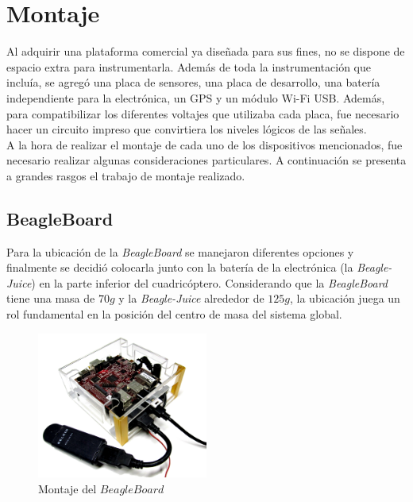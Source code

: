 \documentclass[main]{subfiles}
\begin{document}
\chapter{Montaje}
\label{chap:montaje}

Al adquirir una plataforma comercial ya diseñada para sus fines, no se dispone de espacio extra para instrumentarla. Además de toda la instrumentación que incluía, se agregó una placa de sensores, una placa de desarrollo, una batería independiente para la electrónica, un GPS y un módulo Wi-Fi USB. Además, para compatibilizar los diferentes voltajes que utilizaba cada placa, fue necesario hacer un circuito impreso que convirtiera los niveles lógicos de las señales.\\

A la hora de realizar el montaje de cada uno de los dispositivos mencionados, fue necesario realizar algunas consideraciones particulares. A continuación se presenta a grandes rasgos el trabajo de montaje realizado.

\section*{BeagleBoard}

Para la ubicación de la \emph{BeagleBoard} se manejaron diferentes opciones y finalmente se decidió colocarla junto con la batería de la electrónica (la \emph{Beagle-Juice}) en la parte inferior del cuadricóptero. Considerando que la \emph{BeagleBoard} tiene una masa de $70g$ y la \emph{Beagle-Juice} alrededor de $125g$, la ubicación juega un rol fundamental en la posición del centro de masa del sistema global.\\

\begin{figure}
	\centering
	\vspace{-20pt}
		\includegraphics[width=0.5\textwidth]{./pics_montaje/beagle.jpg}
	\caption{Montaje del $BeagleBoard$}
	\vspace{-20pt}
	\label{fig:beagle}
\end{figure}
\end{document}
